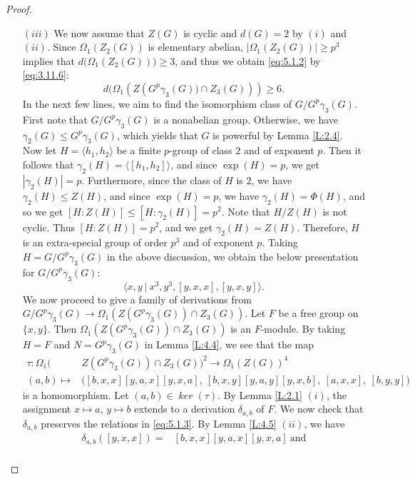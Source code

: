 \documentclass[preprint,sort&compress,12pt]{elsarticle}
\theoremstyle{definition}
\numberwithin{equation}{theorem}
\DeclareMathOperator{\Ker}{\mathit{ker}}
\begin{document}
\begin{proof}
\begin{itemize}
\item [$(iii)$] We now assume that $Z(G)$ is cyclic and $d(G)=2$ by $(i)$ and $(ii)$. Since $\Omega_1(Z_2(G))$ is elementary abelian, $|\Omega_1(Z_2(G))|\ge p^3$ implies that $d\big(\Omega_1(Z_2(G))\big)\ge 3$, and thus we obtain \eqref{eq:5.1.2} by \eqref{eq:3.11.6}:
\begin{equation}\label{eq:5.1.2}
d\big(\Omega_1(Z(G^p\gamma_3(G)\big)\cap Z_3(G)))\ge 6.
\end{equation}
\noindent In the next few lines, we aim to find the isomorphism class of $G/G^p\gamma_3(G)$. First note that $G/G^p\gamma_3(G)$ is a nonabelian group. Otherwise, we have $\gamma_2(G)\le G^p\gamma_3(G)$, which yields that $G$ is powerful by Lemma \ref{L:2.4}. Now let $H=\langle h_1,h_2\rangle$ be a finite $p$-group of class $2$ and of exponent $p$. Then it follows that $\gamma_2(H)=\langle [h_1, h_2]\rangle$, and since $\exp(H)=p$, we get $|\gamma_2(H)|=p$. Furthermore, since the class of $H$ is $2$, we have $\gamma_2(H)\le Z(H)$, and since $\exp(H)=p$, we have $\gamma_2(H)=\Phi(H)$, and so we get $[H: Z(H)]\le [H:\gamma_2(H)]=p^2$. Note that $H/Z(H)$ is not cyclic. Thus $[H: Z(H)]=p^2$, and we get $\gamma_2(H)=Z(H)$. Therefore, $H$ is an extra-special group of order $p^3$ and of exponent $p$. Taking $H=G/G^p\gamma_3(G)$ in the above discussion, we obtain the below presentation for $G/G^p\gamma_3(G)$: 
\begin{equation}\label{eq:5.1.3}
\langle x, y\ |\ x^3, y^3, [y, x, x], [y, x, y]\rangle.
\end{equation}
\noindent We now proceed to give a family of derivations from $G/G^p\gamma_3(G)\rightarrow \Omega_1(Z(G^p\gamma_3(G))\cap Z_3(G))$. Let $F$ be a free group on $\{x, y\}$. Then $\Omega_1(Z(G^p\gamma_3(G))\cap Z_3(G))$ is an $F$-module. By taking $H=F$ and $N=G^p\gamma_3(G)$ in Lemma \ref{L:4.4}, we see that the map
\begin{align*}
\tau: \Omega_1(&Z(G^p\gamma_3(G))\cap Z_3(G))^2\rightarrow \Omega_1(Z(G))^4\\
(a, b)\mapsto& \big([b, x, x][y, a, x][y, x, a],\ [b, x, y][y, a, y][y, x, b],\ [a, x, x],\ [b, y, y]\big)
\end{align*}
\noindent is a homomorphism. Let $(a, b)\in \Ker(\tau)$. By Lemma \ref{L:2.1} $(i)$, the assignment $x\mapsto a$, $y\mapsto b$ extends to a derivation $\delta_{a, b}$ of $F$. We now check that $\delta_{a, b}$ preserves the relations in \eqref{eq:5.1.3}. By Lemma \ref{L:4.5} $(ii)$, we have
\begin{align*}
\delta_{a, b}([y, x, x])= &[b, x, x][y, a, x][y, x, a]\ \text{and}\\

\end{align*}
\end{itemize}
\end{proof}
\end{document}
